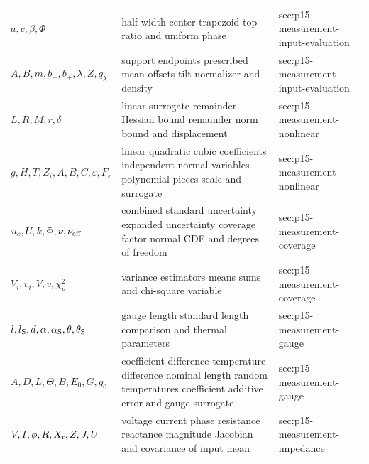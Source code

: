 \begin{longtable}{@{}p{}p{}p{}@{}}
\(a,\allowbreak c,\allowbreak \beta,\allowbreak \Phi\) & half width center trapezoid top ratio and uniform phase & sec:\allowbreak{}p15-\allowbreak{}measurement-\allowbreak{}input-\allowbreak{}evaluation \\
\(A,\allowbreak B,\allowbreak m,\allowbreak b_-,\allowbreak b_+,\allowbreak \lambda,\allowbreak Z,\allowbreak q_\lambda\) & support endpoints prescribed mean offsets tilt normalizer and density & sec:\allowbreak{}p15-\allowbreak{}measurement-\allowbreak{}input-\allowbreak{}evaluation \\
\(L,\allowbreak R,\allowbreak M,\allowbreak r,\allowbreak \delta\) & linear surrogate remainder Hessian bound remainder norm bound and displacement & sec:\allowbreak{}p15-\allowbreak{}measurement-\allowbreak{}nonlinear \\
\(g,\allowbreak H,\allowbreak T,\allowbreak Z_i,\allowbreak A,\allowbreak B,\allowbreak C,\allowbreak \varepsilon,\allowbreak F_\varepsilon\) & linear quadratic cubic coefficients independent normal variables polynomial pieces scale and surrogate & sec:\allowbreak{}p15-\allowbreak{}measurement-\allowbreak{}nonlinear \\
\(u_c,\allowbreak U,\allowbreak k,\allowbreak \Phi,\allowbreak \nu,\allowbreak \nu_{\rm eff}\) & combined standard uncertainty expanded uncertainty coverage factor normal CDF and degrees of freedom & sec:\allowbreak{}p15-\allowbreak{}measurement-\allowbreak{}coverage \\
\(V_i,\allowbreak v_i,\allowbreak V,\allowbreak v,\allowbreak \chi_\nu^2\) & variance estimators means sums and chi-square variable & sec:\allowbreak{}p15-\allowbreak{}measurement-\allowbreak{}coverage \\
\(l,\allowbreak l_{\rm S},\allowbreak d,\allowbreak \alpha,\allowbreak \alpha_{\rm S},\allowbreak \theta,\allowbreak \theta_{\rm S}\) & gauge length standard length comparison and thermal parameters & sec:\allowbreak{}p15-\allowbreak{}measurement-\allowbreak{}gauge \\
\(A,\allowbreak D,\allowbreak L,\allowbreak \Theta,\allowbreak B,\allowbreak E_0,\allowbreak G,\allowbreak g_0\) & coefficient difference temperature difference nominal length random temperatures coefficient additive error and gauge surrogate & sec:\allowbreak{}p15-\allowbreak{}measurement-\allowbreak{}gauge \\
\(V,\allowbreak I,\allowbreak \phi,\allowbreak R,\allowbreak X_{\rm r},\allowbreak Z,\allowbreak J,\allowbreak U\) & voltage current phase resistance reactance magnitude Jacobian and covariance of input mean & sec:\allowbreak{}p15-\allowbreak{}measurement-\allowbreak{}impedance \\

\end{longtable}
